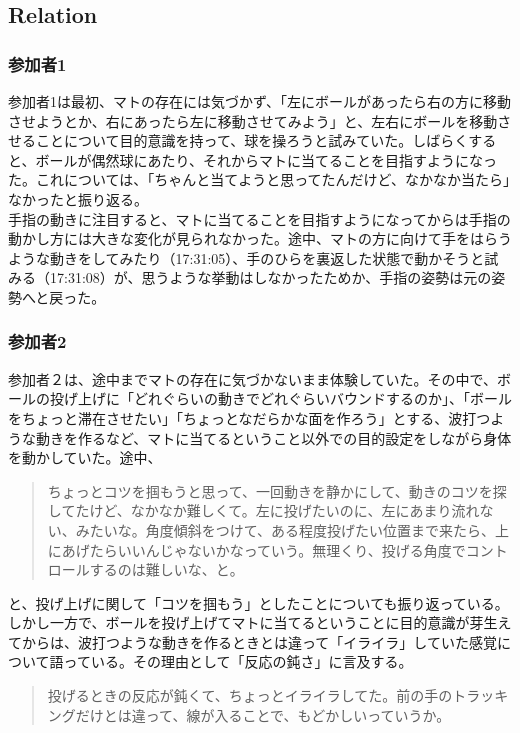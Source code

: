 \subsection{Relation}
\subsubsection*{参加者1}
参加者1は最初、マトの存在には気づかず、「左にボールがあったら右の方に移動させようとか、右にあったら左に移動させてみよう」と、左右にボールを移動させることについて目的意識を持って、球を操ろうと試みていた。しばらくすると、ボールが偶然球にあたり、それからマトに当てることを目指すようになった。これについては、「ちゃんと当てようと思ってたんだけど、なかなか当たら」なかったと振り返る。\\
手指の動きに注目すると、マトに当てることを目指すようになってからは手指の動かし方には大きな変化が見られなかった。途中、マトの方に向けて手をはらうような動きをしてみたり（17:31:05）、手のひらを裏返した状態で動かそうと試みる（17:31:08）が、思うような挙動はしなかったためか、手指の姿勢は元の姿勢へと戻った。
\subsubsection*{参加者2}
参加者２は、途中までマトの存在に気づかないまま体験していた。その中で、ボールの投げ上げに「どれぐらいの動きでどれぐらいバウンドするのか」、「ボールをちょっと滞在させたい」「ちょっとなだらかな面を作ろう」とする、波打つような動きを作るなど、マトに当てるということ以外での目的設定をしながら身体を動かしていた。途中、
\begin{quote}
  ちょっとコツを掴もうと思って、一回動きを静かにして、動きのコツを探してたけど、なかなか難しくて。左に投げたいのに、左にあまり流れない、みたいな。角度傾斜をつけて、ある程度投げたい位置まで来たら、上にあげたらいいんじゃないかなっていう。無理くり、投げる角度でコントロールするのは難しいな、と。  
\end{quote}
と、投げ上げに関して「コツを掴もう」としたことについても振り返っている。しかし一方で、ボールを投げ上げてマトに当てるということに目的意識が芽生えてからは、波打つような動きを作るときとは違って「イライラ」していた感覚について語っている。その理由として「反応の鈍さ」に言及する。
\begin{quote}
  投げるときの反応が鈍くて、ちょっとイライラしてた。前の手のトラッキングだけとは違って、線が入ることで、もどかしいっていうか。  
\end{quote}
